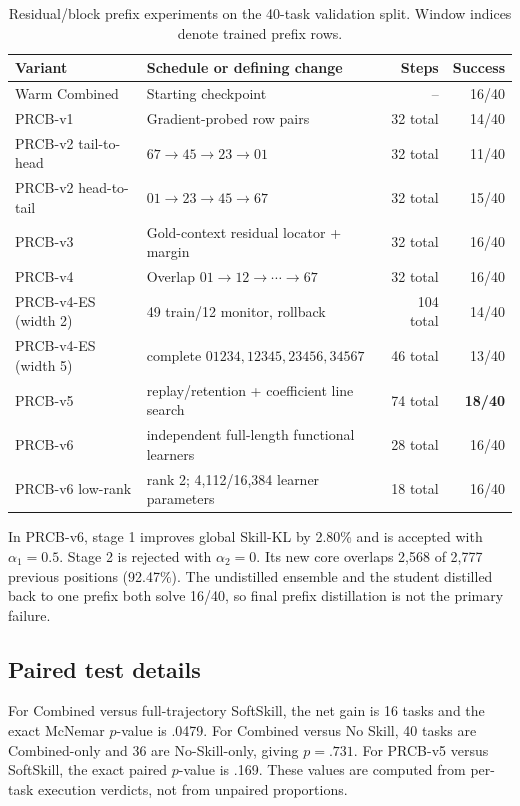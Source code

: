 \begin{table}[h]
\caption{Residual/block prefix experiments on the 40-task validation split.  Window indices denote trained prefix rows.}
\centering
\scriptsize
\begin{tabular}{p{3.2cm}p{6.7cm}rr}
\toprule
Variant & Schedule or defining change & Steps & Success \\
\midrule
Warm Combined & Starting checkpoint & -- & 16/40 \\
PRCB-v1 & Gradient-probed row pairs & 32 total & 14/40 \\
PRCB-v2 tail-to-head & $67\!\rightarrow\!45\!\rightarrow\!23\!\rightarrow\!01$ & 32 total & 11/40 \\
PRCB-v2 head-to-tail & $01\!\rightarrow\!23\!\rightarrow\!45\!\rightarrow\!67$ & 32 total & 15/40 \\
PRCB-v3 & Gold-context residual locator + margin & 32 total & 16/40 \\
PRCB-v4 & Overlap $01\!\rightarrow\!12\!\rightarrow\!\cdots\!\rightarrow\!67$ & 32 total & 16/40 \\
PRCB-v4-ES (width 2) & 49 train/12 monitor, rollback & 104 total & 14/40 \\
PRCB-v4-ES (width 5) & complete $01234,12345,23456,34567$ & 46 total & 13/40 \\
PRCB-v5 & replay/retention + coefficient line search & 74 total & \textbf{18/40} \\
PRCB-v6 & independent full-length functional learners & 28 total & 16/40 \\
PRCB-v6 low-rank & rank 2; 4,112/16,384 learner parameters & 18 total & 16/40 \\
\bottomrule
\end{tabular}
\end{table}

\FloatBarrier
In PRCB-v6, stage 1 improves global Skill-KL by 2.80\% and is accepted with $\alpha_1=0.5$.  Stage 2 is rejected with $\alpha_2=0$.  Its new core overlaps 2,568 of 2,777 previous positions (92.47\%).  The undistilled ensemble and the student distilled back to one prefix both solve 16/40, so final prefix distillation is not the primary failure.

\subsection{Paired test details}

For Combined versus full-trajectory SoftSkill, the net gain is 16 tasks and the exact McNemar $p$-value is .0479.  For Combined versus No Skill, 40 tasks are Combined-only and 36 are No-Skill-only, giving $p=.731$.  For PRCB-v5 versus SoftSkill, the exact paired $p$-value is .169.  These values are computed from per-task execution verdicts, not from unpaired proportions.

